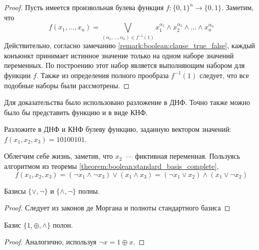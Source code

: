 \begin{proof}
    Пусть имеется произвольная булева функция $ f: \{0, 1\}^n \rightarrow \{0, 1\} $.
    Заметим, что
    \[
        f(x_1, \ldots, x_n) = \bigvee_{(\alpha_1, \ldots, \alpha_n) \in f^{-1}(1)} x_1^{\alpha_1} \wedge x_2^{\alpha_2} \wedge \ldots \wedge x_n^{\alpha_n}
    \]
    Действительно, согласно замечанию \ref{remark:boolean:clause_true_false},
    каждый конъюнкт принимает истинное значение только на одном наборе значений переменных.
    По построению этот набор является выполняющим набором для функции $ f $.
    Также из определения полного прообраза $ f^{-1}(1) $ следует, что все подобные наборы были рассмотрены.
\end{proof}

Для доказательства было использовано разложение в ДНФ.
Точно также можно было бы представить функцию и в виде КНФ.

\begin{Exercise}[counter=SecExercise, label={exercise:boolean:DNF_example}]
    \noindent
    Разложите в ДНФ и КНФ булеву функцию, заданную вектором
    значений: $ f(x_1, x_2, x_3) = 10100101 $.
\end{Exercise}

\begin{Answer}
    \noindent
    Облегчим себе жизнь, заметив, что $ x_2 $~--- фиктивная переменная.
    Пользуясь алгоритмом из теоремы \ref{theorem:boolean:standard_basis_complete},
    \[
        f(x_1, x_2, x_3) = (\neg x_1 \wedge \neg x_3) \vee (x_1 \wedge x_3) = (\neg x_1 \vee x_2) \wedge (x_1 \vee \neg x_2)
    \]
\end{Answer}


\begin{corollary}
    \label{corollary:boolean:substandard_basis_complete}
    Базисы $ \{ \vee, \neg \} $ и $ \{ \wedge, \neg \} $ полны.
\end{corollary}

\begin{proof}
    Следует из законов де Моргана и полноты стандартного базиса
\end{proof}


\begin{corollary}
    \label{corollary:boolean:Zhegalkin_basis_complete}
    Базис $ \{ 1, \oplus, \wedge \} $ полон.
\end{corollary}

\begin{proof}
    Аналогично, используя $ \neg x = 1 \oplus x $.
\end{proof}


